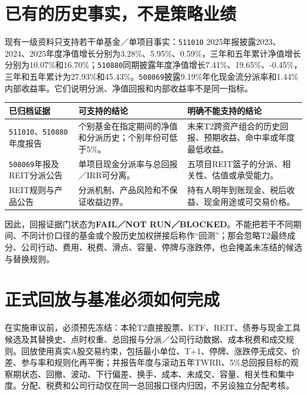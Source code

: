 \section{已有的历史事实，不是策略业绩}

现有一级资料只支持若干单基金／单项目事实：\texttt{511010} 2025年报披露2023、2024、2025年度净值增长分别为3.28\%、5.95\%、0.59\%，三年和五年累计净值增长分别为10.07\%和16.70\%；\texttt{510880}同期披露年度净值增长7.41\%、19.65\%、-0.45\%，三年和五年累计为27.93\%和45.43\%。\texttt{508069}披露9.19\%年化现金流分派率和1.44\%内部收益率。它们说明分派、净值回报和内部收益率不是同一指标。

\begin{exhibitbox}
\small
\begin{tabularx}{\exhibitboxwidth}{L{3.2cm}P P}
\toprule
\textbf{已归档证据} & \textbf{可支持的结论} & \textbf{明确不能支持的结论} \\
\midrule
\texttt{511010}、\texttt{510880}年度报告 & 个别基金在指定期间的净值和分派历史；个别年份可低于5\%。 & 未来T2跨资产组合的历史回报、预期收益、命中率或年度最低收益。 \\
\texttt{508069}年报及REIT分派公告 & 单项目现金分派率与总回报／IRR可分离。 & 五项目REIT篮子的分派、相关性、估值或承受能力。 \\
REIT规则与产品公告 & 分派机制、产品风险和不保证收益边界。 & 持有人明年到账现金、税后收益、现金用途或可交易价格。 \\
\bottomrule
\end{tabularx}
\end{exhibitbox}

因此，回报证据门状态为\textbf{FAIL／NOT RUN／BLOCKED}。不能把若干不同期间、不同计价口径的基金或个股历史加权拼接后称作“回测”；那会忽略T2最终成分、公司行动、费用、税费、滑点、容量、停牌与涨跌停，也会掩盖未冻结的候选与替换规则。

\section{正式回放与基准必须如何完成}

在实施审议前，必须预先冻结：本轮T2直接股票、ETF、REIT、债券与现金工具候选及其替换史、点时权重、总回报与分派／公司行动数据、成本税费和成交规则。回放使用真实A股交易约束，包括最小单位、T+1、停牌、涨跌停无成交、价差、参与率和规则化再平衡；并报告年度与滚动五年TWRR、5\%总回报目标的观察期状态、回撤、波动、下行偏差、换手、成本、未成交、容量、相关性和集中度。分配、税费和公司行动仅在同一总回报口径内归因，不另设独立分配考核。


